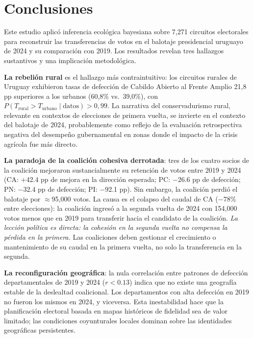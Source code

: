 
\section{Conclusiones}
\label{sec:conclusiones}

Este estudio aplicó inferencia ecológica bayesiana sobre 7{,}271 circuitos electorales para reconstruir las transferencias de votos en el balotaje presidencial uruguayo de 2024 y su comparación con 2019. Los resultados revelan tres hallazgos sustantivos y una implicación metodológica.

\textbf{La rebelión rural} es el hallazgo más contraintuitivo: los circuitos rurales de Uruguay exhibieron tasas de defección de Cabildo Abierto al Frente Amplio 21{,}8 pp superiores a los urbanos (60{,}8\% vs.\ 39{,}0\%), con $P(T_{\text{rural}} > T_{\text{urbano}} \mid \text{datos}) > 0{,}99$. La narrativa del conservadurismo rural, relevante en contextos de elecciones de primera vuelta, se invierte en el contexto del balotaje de 2024, probablemente como reflejo de la evaluación retrospectiva negativa del desempeño gubernamental en zonas donde el impacto de la crisis agrícola fue más directo.

\textbf{La paradoja de la coalición cohesiva derrotada}: tres de los cuatro socios de la coalición mejoraron sustancialmente su retención de votos entre 2019 y 2024 (CA: $+$42.4 pp de mejora en la dirección esperada; PC: $-$26.6 pp de defección; PN: $-$32.4 pp de defección; PI: $-$92.1 pp). Sin embargo, la coalición perdió el balotaje por $\approx$95{,}000 votos. La causa es el colapso del caudal de CA ($-$78\% entre elecciones): la coalición ingresó a la segunda vuelta de 2024 con 154{,}000 votos menos que en 2019 para transferir hacia el candidato de la coalición. \textit{La lección política es directa: la cohesión en la segunda vuelta no compensa la pérdida en la primera.} Las coaliciones deben gestionar el crecimiento o mantenimiento de su caudal en la primera vuelta, no solo la transferencia en la segunda.

\textbf{La reconfiguración geográfica}: la nula correlación entre patrones de defección departamentales de 2019 y 2024 ($r < 0.13$) indica que no existe una geografía estable de la deslealtad coalicional. Los departamentos con alta defección en 2019 no fueron los mismos en 2024, y viceversa. Esta inestabilidad hace que la planificación electoral basada en mapas históricos de fidelidad sea de valor limitado; las condiciones coyunturales locales dominan sobre las identidades geográficas persistentes.

